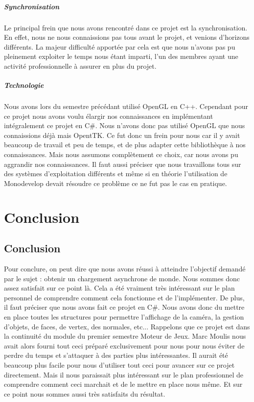 \documentclass{report}
\begin{document}
			\paragraph{Synchronisation}
				Le principal frein que nous avons rencontré dans ce projet est la synchronisation. En effet, nous ne nous connaissions pas tous avant le projet, et venions d'horizons différents.
				La majeur difficulté apportée par cela est que nous n'avons pas pu pleinement exploiter le temps nous étant imparti, l'un des membres ayant une activité professionnelle à assurer en plus du projet.
			\paragraph{Technologie}
				Nous avons lors du semestre précédant utilisé OpenGL en C++. Cependant pour ce projet nous avons voulu élargir nos connaissances en implémentant intégralement ce projet en C\#. Nous n'avons donc pas utilisé OpenGL que nous connaissions déjà mais OpentTK. Ce fut donc un frein pour nous car il y avait beaucoup de travail et peu de temps, et de plus adapter cette bibliothèque à nos connaissances. Mais nous assumons complètement ce choix, car nous avons pu aggrandir nos connaissances.
				Il faut aussi préciser que nous travaillons tous sur des systèmes d'exploitation différents et même si en théorie l'utilisation de Monodevelop devait résoudre ce problème ce ne fut pas le cas en pratique. 
				
	\chapter{Conclusion}
		
		\section{Conclusion}
		 Pour conclure, on peut dire que nous avons réussi à atteindre l'objectif demandé par le sujet : obtenir un chargement asynchrone de monde. Nous sommes donc assez satisfait sur ce point là. Cela a été vraiment très intéressant sur le plan personnel de comprendre comment cela fonctionne et de l'implémenter. De plus, il faut préciser que nous avons fait ce projet en C\#. Nous avons donc du mettre en place toutes les structures pour permettre l'affichage de la caméra, la gestion d'objets, de faces, de vertex, des normales, etc... Rappelons que ce projet est dans la continuité du module du premier semestre Moteur de Jeux. Marc Moulis nous avait alors fourni tout ceci préparé exclusivement pour nous pour nous éviter de perdre du temps et s'attaquer à des parties plus intéressantes. Il aurait été beaucoup plus facile pour nous d'utiliser tout ceci pour avancer sur ce projet directement. Mais il nous paraissait plus intéressant sur le plan professionnel de comprendre comment ceci marchait et de le mettre en place nous même. Et sur ce point nous sommes aussi très satisfaits du résultat.
		 
\end{document}
